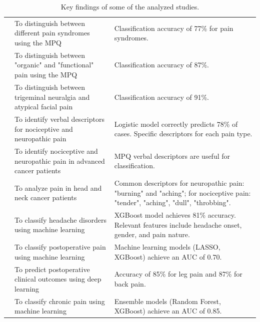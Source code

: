 \documentclass[preprint,12pt,authoryear]{elsarticle}
\begin{document}
\begin{table}[t!]
{\begin{tabular}{p{5.2cm} p{9.8cm} p{11cm}}
\citep{dubuisson1976classification}
& To distinguish between different pain syndromes using the MPQ 
& Classification accuracy of 77\% for pain syndromes. \\

\citep{leavitt1980validity} 
& To distinguish between "organic" and "functional" pain using the MPQ 
& Classification accuracy of 87\%. \\

\citep{melzack1986trigeminal}
& To distinguish between trigeminal neuralgia and atypical facial pain 
& Classification accuracy of 91\%. \\

\citep{wilkie2001nociceptive} 
& To identify verbal descriptors for nociceptive and neuropathic pain 
& Logistic model correctly predicts 78\% of cases. Specific descriptors for each pain type. \\

\citep{dobratz2009word}
& To identify nociceptive and neuropathic pain in advanced cancer patients 
& MPQ verbal descriptors are useful for classification. \\

\citep{epstein2009neuropathic} 
& To analyze pain in head and neck cancer patients 
& Common descriptors for neuropathic pain: "burning" and "aching"; for nociceptive pain: "tender", "aching", "dull", "throbbing". \\

\midrule

\citep{lotsch2018machine} 
& To classify headache disorders using machine learning 
& XGBoost model achieves 81\% accuracy. Relevant features include headache onset, gender, and pain nature. \\

\citep{tighe2015teaching}
& To classify postoperative pain using machine learning 
& Machine learning models (LASSO, XGBoost) achieve an AUC of 0.70. \\

\citep{staartjes2019deep} 
& To predict postoperative clinical outcomes using deep learning 
& Accuracy of 85\% for leg pain and 87\% for back pain. \\

\citep{santana2020chronic}
& To classify chronic pain using machine learning 
& Ensemble models (Random Forest, XGBoost) achieve an AUC of 0.85. \\

\bottomrule
\end{tabular}}
\caption{Key findings of some of the analyzed studies.}
\label{tab:key_findings}
\end{table}
\end{document}
